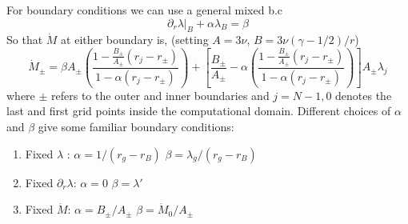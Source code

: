 \documentclass{article}
\begin{document}
For boundary conditions we can use a general mixed b.c
\begin{equation}
\left. \partial_r \lambda \right|_B + \alpha \lambda_B = \beta
\end{equation}
So that $\dot{M}$ at either boundary is, (setting $A = 3 \nu$, $B = 3 \nu (\gamma -1/2)/r$)
\begin{equation}
\dot{M}_{\pm} = \beta A_\pm \left( \frac{1 - \frac{B_\pm}{A_\pm} (r_j - r_\pm)}{1 - \alpha (r_j - r_\pm)} \right)  + \left[ \frac{B_\pm}{A_\pm} - \alpha \left( \frac{ 1 - \frac{B_\pm}{A_\pm}(r_j - r_\pm)}{1 - \alpha (r_j - r_\pm)} \right)  \right] A_\pm  \lambda_j
\end{equation}
where $\pm$ refers to the outer and inner boundaries and $j = N-1,0$ denotes the last and first grid points inside the computational domain. Different choices of $\alpha$ and $\beta$ give some familiar boundary conditions:
\begin{enumerate}
\item Fixed $\lambda$ : \hfill $\alpha = 1/(r_g - r_B)$ \hfill $\beta = \lambda_g/(r_g - r_B)$
\item Fixed $\partial_r \lambda$: \hfill $\alpha = 0$ \hfill $ \beta = \lambda'$
\item Fixed $\dot{M}$: \hfill $\alpha = B_\pm / A_\pm$ \hfill $\beta = \dot{M}_0 / A_\pm$
\end{enumerate}
\end{document}
